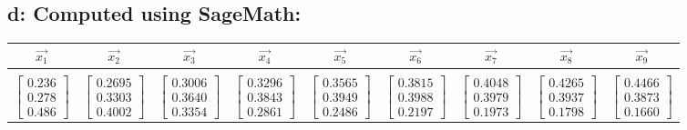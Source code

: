 \documentclass{article}
\begin{document}
\subsection*{d: Computed using SageMath:}
\textbf{}
\begin{tabular}{c|c|c|c|c|c|c|c|c}
    $\vec{x_1}$&$\vec{x_2}$&$\vec{x_3}$&$\vec{x_4}$&$\vec{x_5}$&$\vec{x_6}$&$\vec{x_7}$&$\vec{x_8}$&$\vec{x_9}$ \\ \hline
    \\$\begin{bmatrix}0.236\\0.278\\0.486 \end{bmatrix}$ & $\begin{bmatrix}0.2695 \\ 0.3303 \\0.4002\end{bmatrix}$ & $\begin{bmatrix}0.3006 \\ 0.3640 \\0.3354\end{bmatrix}$ & $\begin{bmatrix}0.3296 \\ 0.3843 \\0.2861\end{bmatrix}$ & $\begin{bmatrix}0.3565 \\ 0.3949 \\0.2486\end{bmatrix}$ & $\begin{bmatrix}0.3815 \\ 0.3988 \\0.2197\end{bmatrix}$ & $\begin{bmatrix}0.4048 \\ 0.3979 \\0.1973\end{bmatrix}$ & $\begin{bmatrix}0.4265 \\ 0.3937 \\0.1798\end{bmatrix}$ & $\begin{bmatrix}0.4466 \\ 0.3873 \\0.1660\end{bmatrix}$
\end{tabular}
\end{document}
